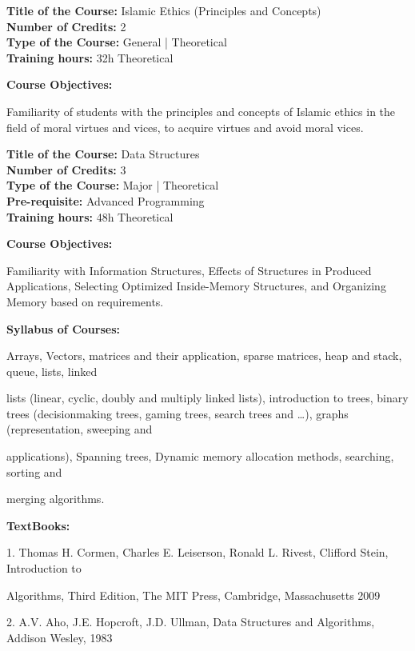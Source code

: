 \documentclass[12pt,a4paper]{article}
\begin{document}
\par\vspace{14pt}
\nopagebreak
\textbf{Title of the Course:} Islamic Ethics (Principles and Concepts)\\
\textbf{Number of Credits:} 2\\
\textbf{Type of the Course:} General | Theoretical\\
\textbf{Training hours:} 32h Theoretical\par\vspace{4pt}
\textbf{Course Objectives:}\par\vspace{2pt}
Familiarity of students with the principles and concepts of Islamic ethics in the field of moral
virtues and vices, to acquire virtues and avoid moral vices.\par\vspace{4pt}

\newpage
\textbf{Title of the Course:} Data Structures\\
\textbf{Number of Credits:} 3\\
\textbf{Type of the Course:} Major | Theoretical\\
\textbf{Pre-requisite:} Advanced Programming\\
\textbf{Training hours:} 48h Theoretical\par\vspace{4pt}
\textbf{Course Objectives:}\par\vspace{2pt}
Familiarity with Information Structures, Effects of Structures in Produced Applications, Selecting
Optimized Inside-Memory Structures, and Organizing Memory based on requirements.\par\vspace{4pt}
\textbf{Syllabus of Courses:}\par\vspace{2pt}
Arrays, Vectors, matrices and their application, sparse matrices, heap and stack, queue, lists, linked\par
lists (linear, cyclic, doubly and multiply linked lists), introduction to trees, binary trees (decisionmaking trees, gaming trees, search trees and …), graphs (representation, sweeping and\par
applications), Spanning trees, Dynamic memory allocation methods, searching, sorting and\par
merging algorithms.\par\vspace{4pt}
\textbf{TextBooks:}\par\vspace{2pt}
1. Thomas H. Cormen, Charles E. Leiserson, Ronald L. Rivest, Clifford Stein, Introduction to\par
Algorithms, Third Edition, The MIT Press, Cambridge, Massachusetts 2009\par
2. A.V. Aho, J.E. Hopcroft, J.D. Ullman, Data Structures and Algorithms, Addison Wesley, 1983\par
\vspace{4pt}
\end{document}
